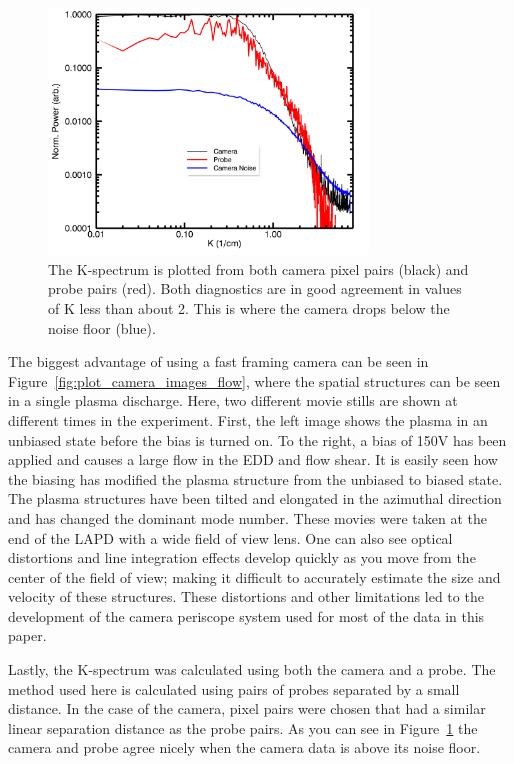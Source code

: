 \documentclass{jpp}
\begin{document}
\begin{figure}
\centerline{\includegraphics[width=8.5cm]{plot_k_spectra}}
\caption{ The K-spectrum is plotted from both camera pixel pairs (black) and probe pairs (red). Both diagnostics are in good agreement in values of K less than about 2. This is where the camera drops below the noise floor (blue). }
\label{fig:plot_k_spectra}
\end{figure}


The biggest advantage of using a fast framing camera can be seen in Figure~\ref{fig:plot_camera_images_flow}, where the spatial structures can be seen in a single plasma discharge. Here, two different movie stills are shown at different times in the experiment.  First, the left image shows the plasma in an unbiased state before the bias is turned on.  To the right, a bias of 150V has been applied and causes a large flow in the EDD and flow shear.  It is easily seen how the biasing has modified the plasma structure from the unbiased to biased state.  The plasma structures have been tilted and elongated in the azimuthal direction and has changed the dominant mode number.  These movies were taken at the end of the LAPD with a wide field of view lens. One can also see optical distortions and line integration effects develop quickly as you move from the center of the field of view; making it difficult to accurately estimate the size and velocity of these structures. These distortions and other limitations led to the development of the camera periscope system used for most of the data in this paper.

Lastly, the K-spectrum was calculated using both the camera and a probe. The method \citep{beall82} used here is calculated using pairs of probes separated by a small distance. In the case of the camera, pixel pairs were chosen that had a similar linear separation distance as the probe pairs. As you can see in Figure~\ref{fig:plot_k_spectra} the camera and probe agree nicely when the camera data is above its noise floor.
 
\end{document}
